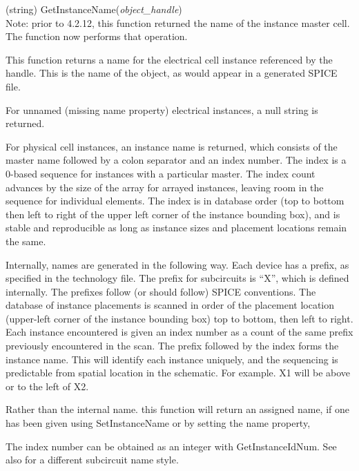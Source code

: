 \begin{description}
\item{(string) \vt GetInstanceName({\it object\_handle\/})}\\
Note:  prior to 4.2.12, this function returned the name of the
instance master cell.  The  function now
performs that operation.

This function returns a name for the electrical cell instance
referenced by the handle.  This is the name of the object, as would
appear in a generated SPICE file.

For unnamed (missing name property) electrical instances, a null
string is returned.
  
For physical cell instances, an instance name is returned, which
consists of the master name followed by a colon separator and an index
number.  The index is a 0-based sequence for instances with a
particular master.  The index count advances by the size of the array
for arrayed instances, leaving room in the sequence for individual
elements.  The index is in database order (top to bottom then left to
right of the upper left corner of the instance bounding box), and is
stable and reproducible as long as instance sizes and placement
locations remain the same.

Internally, names are generated in the following way.  Each device has
a prefix, as specified in the technology file.  The prefix for
subcircuits is ``X'', which is defined internally.  The prefixes
follow (or should follow) SPICE conventions.  The database of instance
placements is scanned in order of the placement location (upper-left
corner of the instance bounding box) top to bottom, then left to
right.  Each instance encountered is given an index number as a count
of the same prefix previously encountered in the scan.  The prefix
followed by the index forms the instance name.  This will identify
each instance uniquely, and the sequencing is predictable from spatial
location in the schematic.  For example.  {\vt X1} will be above or
to the left of {\vt X2}.

Rather than the internal name.  this function will return an assigned
name, if one has been given using {\vt SetInstanceName} or by setting
the name property,

The index number can be obtained as an integer with {\vt
GetInstanceIdNum}.  See also  for a
different subcircuit name style.


\end{description}
